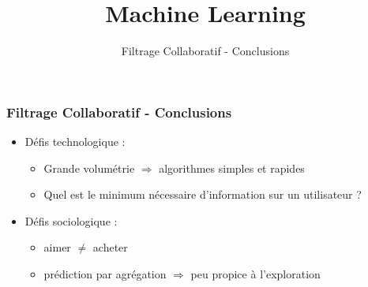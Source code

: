 \documentclass{formation}
\title{Machine Learning}
\subtitle{Filtrage Collaboratif - Conclusions}
\begin{document}
\maketitle

\begin{frame}
  \frametitle{Filtrage Collaboratif - Conclusions}
  \begin{itemize}[<+->]
  \item Défis technologique :
    \begin{itemize}[<+->]
    \item Grande volumétrie $\Rightarrow$ algorithmes simples et rapides
    \item Quel est le minimum nécessaire d'information sur un utilisateur ?
    \end{itemize}
  \item Défis sociologique :
    \begin{itemize}[<+->]
    \item aimer $\neq$ acheter
    \item prédiction par agrégation $\Rightarrow$ peu propice à l'exploration
    \end{itemize}
  \end{itemize}
\end{frame}
\end{document}
